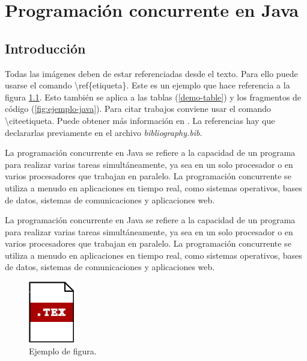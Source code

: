 \chapter{Programación concurrente en Java}

\section{Introducción}

Todas las imágenes deben de estar referenciadas desde el texto. Para ello puede usarse el comando \textbackslash ref\{etiqueta\}. Este es un ejemplo que hace referencia a la figura \ref{fig:etiqueta1}. Esto también se aplica a las tablas (\ref{demo-table}) y los fragmentos de código (\ref{fig:ejemplo-java}). Para citar trabajos conviene usar el comando \textbackslash cite{etiqueta}. Puede obtener más información en \cite{greenwade93} \cite{goossens93}. La referencias hay que declararlas previamente en el archivo \textit{bibliography.bib}.

La programación concurrente en Java se refiere a la capacidad de un programa para realizar varias tareas simultáneamente, ya sea en un solo procesador o en varios procesadores que trabajan en paralelo. La programación concurrente se utiliza a menudo en aplicaciones en tiempo real, como sistemas operativos, bases de datos, sistemas de comunicaciones y aplicaciones web.

La programación concurrente en Java se refiere a la capacidad de un programa para realizar varias tareas simultáneamente, ya sea en un solo procesador o en varios procesadores que trabajan en paralelo. La programación concurrente se utiliza a menudo en aplicaciones en tiempo real, como sistemas operativos, bases de datos, sistemas de comunicaciones y aplicaciones web. 

\begin{figure}
	\centering
	\includegraphics[width=0.25\linewidth]{img/tex-icon}
	\caption{Ejemplo de figura.}
	\label{fig:etiqueta1}
\end{figure}

